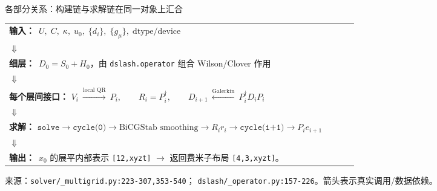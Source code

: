 \documentclass[UTF8,aspectratio=169,11pt]{ctexbeamer}
\newcommand{\source}[1]{%
  \vspace{0.06em}\par{\raggedright\scriptsize\color{muted}来源：#1\par}}
\newcommand{\pathref}[1]{\nolinkurl{#1}}
\begin{document}
\begin{frame}[t]{各部分关系：构建链与求解链在同一对象上汇合}
  \begin{center}
    \begin{tabular}{@{}p{0.92\linewidth}@{}}
      \toprule
      \textbf{输入：}\ $U,\;C,\;\kappa,\;u_0,\;\{d_i\},\;\{g_\mu\},\;\text{dtype/device}$
      \\
      $\Downarrow$ \\
      \textbf{细层：}\ $D_0=S_0+H_0$，由 \texttt{dslash.operator} 组合 Wilson/Clover 作用
      \\
      $\Downarrow$ \\
      \textbf{每个层间接口：}\quad
      $V_i\ \xrightarrow{\text{local QR}}\ P_i,\qquad
      R_i=P_i^\dagger,\qquad
      D_{i+1}\ \xleftarrow{\text{Galerkin}}\ P_i^\dagger D_i P_i$
      \\
      $\Downarrow$ \\
      \textbf{求解：}\quad
      $\texttt{solve} \rightarrow \texttt{cycle(0)}
      \rightarrow \text{BiCGStab smoothing}
      \rightarrow R_i r_i
      \rightarrow \texttt{cycle(i+1)}
      \rightarrow P_i e_{i+1}$
      \\
      $\Downarrow$ \\
      \textbf{输出：}\ $x_0$ 的展平内部表示 \texttt{[12,xyzt]}
      $\rightarrow$ 返回费米子布局 \texttt{[4,3,xyzt]}。
      \\
      \bottomrule
    \end{tabular}
  \end{center}
  \source{\pathref{solver/_multigrid.py:223-307,353-540}；
  \pathref{dslash/_operator.py:157-226}。箭头表示真实调用/数据依赖。}
\end{frame}
\end{document}
